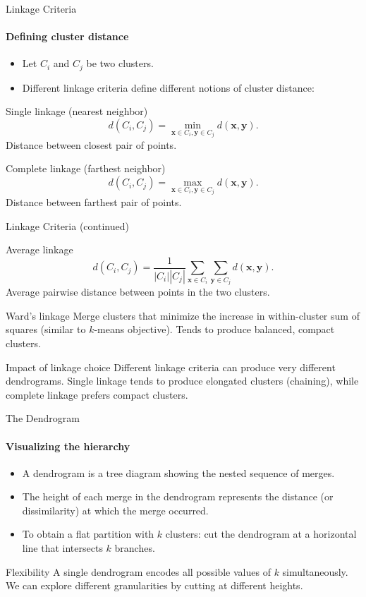 \begin{frame}{Linkage Criteria}
  \framesubtitle{Defining cluster distance}
  \begin{itemize}
    \item Let $C_i$ and $C_j$ be two clusters.
    \item Different linkage criteria define different notions of cluster distance:
  \end{itemize}
  \begin{block}{Single linkage (nearest neighbor)}
    \[
    d(C_i, C_j) = \min_{\mathbf{x}\in C_i, \mathbf{y}\in C_j} d(\mathbf{x}, \mathbf{y}).
    \]
    Distance between closest pair of points.
  \end{block}
  \begin{block}{Complete linkage (farthest neighbor)}
    \[
    d(C_i, C_j) = \max_{\mathbf{x}\in C_i, \mathbf{y}\in C_j} d(\mathbf{x}, \mathbf{y}).
    \]
    Distance between farthest pair of points.
  \end{block}
\end{frame}

\begin{frame}{Linkage Criteria (continued)}
  \begin{block}{Average linkage}
    \[
    d(C_i, C_j) = \frac{1}{|C_i||C_j|}\sum_{\mathbf{x}\in C_i}\sum_{\mathbf{y}\in C_j}
                  d(\mathbf{x}, \mathbf{y}).
    \]
    Average pairwise distance between points in the two clusters.
  \end{block}
  \begin{block}{Ward's linkage}
    Merge clusters that minimize the increase in within-cluster sum of squares (similar
    to $k$-means objective). Tends to produce balanced, compact clusters.
  \end{block}
  \begin{alertblock}{Impact of linkage choice}
    Different linkage criteria can produce very different dendrograms. Single linkage tends
    to produce elongated clusters (chaining), while complete linkage prefers compact clusters.
  \end{alertblock}
\end{frame}

\begin{frame}{The Dendrogram}
  \framesubtitle{Visualizing the hierarchy}
  \begin{itemize}
    \item A \alert{dendrogram} is a tree diagram showing the nested sequence of merges.
    \item The \alert{height} of each merge in the dendrogram represents the distance (or
          dissimilarity) at which the merge occurred.
    \item To obtain a flat partition with $k$ clusters: \alert{cut} the dendrogram at a
          horizontal line that intersects $k$ branches.
  \end{itemize}
  \begin{block}{Flexibility}
    A single dendrogram encodes all possible values of $k$ simultaneously. We can explore
    different granularities by cutting at different heights.
  \end{block}
\end{frame}

